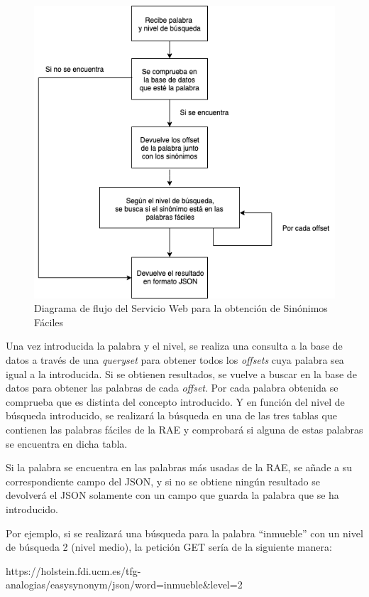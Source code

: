 \begin{figure}[!h]
	\includegraphics[width=.9\textwidth]{Imagenes/Bitmap/Capitulo4/ServiciosWeb/DiagramaFlujoSinonimos.png}
	\centering
	\caption{Diagrama de flujo del Servicio Web para la obtención de Sinónimos Fáciles}
	\label{fig:swsinonimos}
\end{figure}
Una vez introducida la palabra y el nivel, se realiza una consulta a la base de datos a través de una \textit{queryset} para obtener todos los \textit{offsets} cuya palabra sea igual a la introducida.
Si se obtienen resultados, se vuelve a buscar en la base de datos para obtener las palabras de cada \textit{offset}. Por cada palabra obtenida  se comprueba que es distinta del concepto introducido. Y en función del nivel de búsqueda introducido, se realizará la búsqueda en una de las tres tablas que contienen las palabras fáciles de la RAE y comprobará si alguna de estas palabras se encuentra en dicha tabla.

Si la palabra se encuentra en las palabras más usadas de la RAE, se añade a su correspondiente campo del JSON, y si no se obtiene ningún resultado se devolverá el JSON solamente con un campo que guarda la palabra que se ha introducido.

Por ejemplo, si se realizará una búsqueda para la palabra ``inmueble'' con un nivel de búsqueda 2 (nivel medio), la petición GET sería de la siguiente manera:

https://holstein.fdi.ucm.es/tfg-analogias/easysynonym/json/word=inmueble\&level=2

